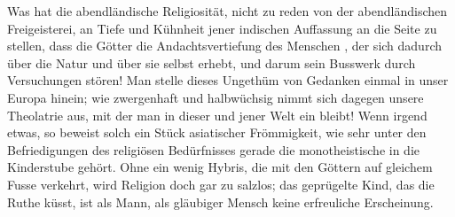 Was hat die abendländische Religiosität, nicht zu reden von der abendländischen Freigeisterei, an Tiefe und Kühnheit jener indischen Auffassung an die Seite zu stellen, dass die Götter die Andachtsvertiefung des Menschen , der sich dadurch über die Natur und über sie selbst erhebt, und darum sein Busswerk durch Versuchungen stören! Man stelle dieses Ungethüm von Gedanken einmal in unser Europa hinein; wie zwergenhaft und halbwüchsig nimmt sich dagegen unsere Theolatrie aus, mit der man in dieser und jener Welt ein  bleibt! Wenn irgend etwas, so beweist solch ein Stück asiatischer Frömmigkeit, wie sehr unter den Befriedigungen des religiösen Bedürfnisses gerade die monotheistische in die Kinderstube gehört. Ohne ein wenig Hybris, die mit den Göttern auf gleichem Fusse verkehrt, wird Religion doch gar zu salzlos; das geprügelte Kind, das die Ruthe küsst, ist als Mann, als gläubiger Mensch keine erfreuliche Erscheinung.
\par

